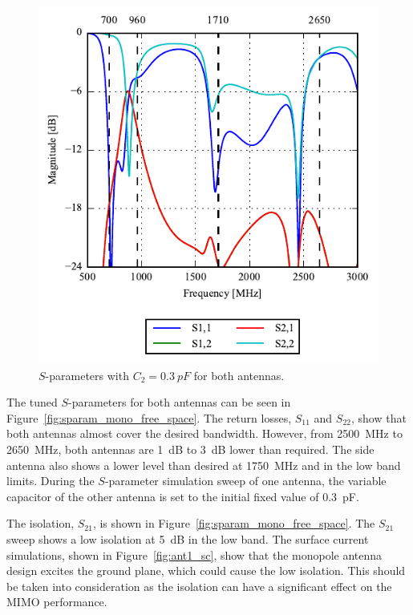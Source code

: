 \begin{figure}[htbp]
    \centering
    \includegraphics{img/tech_sol/monopole/ant1_sparam}
    \caption{$S$-parameters with $C_2=\SI{0.3}{pF}$ for both antennas.}
    \label{fig:ant1_sparam}
\end{figure}
The tuned $S$-parameters for both antennas can be seen in Figure~\ref{fig:sparam_mono_free_space}. The return losses, $S_{11}$ and $S_{22}$, show that both antennas almost cover the desired bandwidth. However, from \SI{2500}{MHz} to \SI{2650}{MHz}, both antennas are \SI{1}{dB} to \SI{3}{dB} lower than required. The side antenna also shows a lower level than desired at \SI{1750}{MHz} and in the low band limits. During the $S$-parameter simulation sweep of one antenna, the variable capacitor of the other antenna is set to the initial fixed value of \SI{0.3}{pF}. 

The isolation, $S_{21}$, is shown in Figure~\ref{fig:sparam_mono_free_space}. The $S_{21}$ sweep shows a low isolation at \SI{5}{dB} in the low band. The surface current simulations, shown in Figure~\ref{fig:ant1_sc}, show that the monopole antenna design excites the ground plane, which could cause the low isolation. This should be taken into consideration as the isolation can have a significant effect on the MIMO performance.

